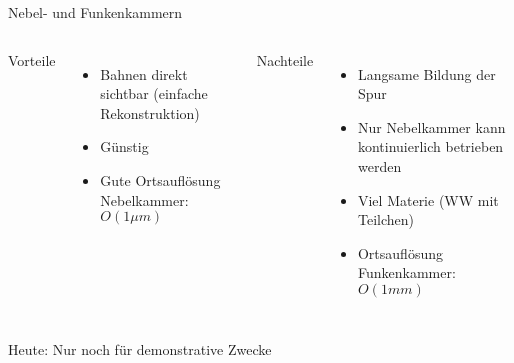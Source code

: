
\begin{frame}{Nebel- und Funkenkammern}
    \begin{columns}[T]
			Vorteile		
			\vspace{0.7cm}
			\begin{itemize}
			  \item Bahnen direkt sichtbar (einfache Rekonstruktion)
			  \item Günstig
			  \item Gute Ortsauflösung Nebelkammer: $O(1 \mu m)$
			\end{itemize}	
	    	Nachteile
	    	\vspace{0.7cm}
	    	\begin{itemize}
			  \item Langsame Bildung der Spur
			  \item Nur Nebelkammer kann kontinuierlich betrieben werden
			  \item Viel Materie (WW mit Teilchen)
			  \item Ortsauflösung Funkenkammer: $O(1 mm)$
			\end{itemize}
    \end{columns}
    \vspace{1cm}
    Heute: Nur noch für demonstrative Zwecke
\end{frame}